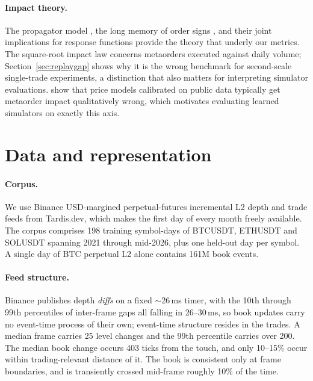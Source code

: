 \documentclass[11pt]{article}
\begin{document}
\paragraph{Impact theory.} The propagator model \citep{bouchaud2004}, the long memory of order signs \citep{lillofarmer2004,lmf2005}, and their joint implications for response functions \citep{bouchaud2009,taranto2016,gatheral2010} provide the theory that underly our metrics. The square-root impact law \citep{toth2011} concerns metaorders executed against daily volume; Section~\ref{sec:replaygap} shows why it is the wrong benchmark for second-scale single-trade experiments, a distinction that also matters for interpreting simulator evaluations. \citet{naviglio2025} show that price models calibrated on public data typically get metaorder impact qualitatively wrong, which motivates evaluating learned simulators on exactly this axis.

\section{Data and representation}
\label{sec:data}

\paragraph{Corpus.} We use Binance USD-margined perpetual-futures incremental L2 depth and trade feeds from Tardis.dev, which makes the first day of every month freely available. The corpus comprises 198 training symbol-days of BTCUSDT, ETHUSDT and SOLUSDT spanning 2021 through mid-2026, plus one held-out day per symbol. A single day of BTC perpetual L2 alone contains 161M book events.

\paragraph{Feed structure.} Binance publishes depth \emph{diffs} on a fixed $\sim$26\,ms timer, with the 10th through 99th percentiles of inter-frame gaps all falling in 26--30\,ms, so book updates carry no event-time process of their own; event-time structure resides in the trades. A median frame carries 25 level changes and the 99th percentile carries over 200. The median book change occurs 403 ticks from the touch, and only 10--15\% occur within trading-relevant distance of it. The book is consistent only at frame boundaries, and is transiently crossed mid-frame roughly 10\% of the time.
\end{document}
